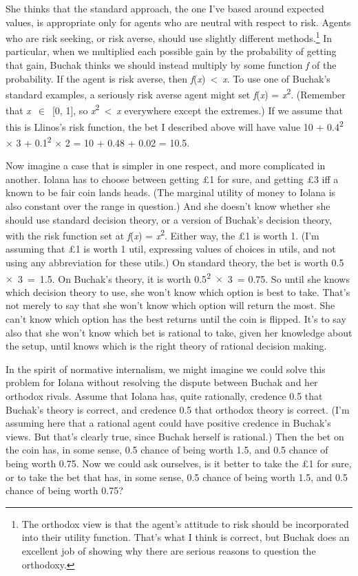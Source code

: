 \documentclass[
  10pt,
  letterpaper,
  twoside]{scrbook}
\begin{document}
She thinks that the standard approach, the one I've based around
expected values, is appropriate only for agents who are neutral with
respect to risk. Agents who are risk seeking, or risk averse, should use
slightly different methods.\footnote{The orthodox view is that the
  agent's attitude to risk should be incorporated into their utility
  function. That's what I think is correct, but Buchak does an excellent
  job of showing why there are serious reasons to question the
  orthodoxy.} In particular, when we multiplied each possible gain by
the probability of getting that gain, Buchak thinks we should instead
multiply by some function \emph{f} of the probability. If the agent is
risk averse, then \emph{f}(\emph{x})~\textless~\emph{x}. To use one of
Buchak's standard examples, a seriously risk averse agent might set
\emph{f}(\emph{x}) = \emph{x}\textsuperscript{2}. (Remember that
\emph{x}~\(\in\)~{[}0, 1{]}, so
\emph{x}\textsuperscript{2}~\textless~\emph{x} everywhere except the
extremes.) If we assume that this is {Llinos}'s risk function, the bet I
described above will have value 10 + 0.4\textsuperscript{2} \(\times\) 3
+ 0.1\textsuperscript{2} \(\times\) 2 = 10 + 0.48 + 0.02 = 10.5.

Now imagine a case that is simpler in one respect, and more complicated
in another. {Iolana} has to choose between getting £1 for sure, and
getting £3 iff a known to be fair coin lands heads. (The marginal
utility of money to Iolana is also constant over the range in question.)
And she doesn't know whether she should use standard decision theory, or
a version of Buchak's decision theory, with the risk function set at
\emph{f}(\emph{x}) = \emph{x}\textsuperscript{2}. Either way, the £1 is
worth 1. (I'm assuming that £1 is worth 1 util, expressing values of
choices in utils, and not using any abbreviation for these utils.) On
standard theory, the bet is worth 0.5~\(\times\)~3~=~1.5. On Buchak's
theory, it is worth 0.5\textsuperscript{2}~\(\times\)~3~= 0.75. So until
she knows which decision theory to use, she won't know which option is
best to take. That's not merely to say that she won't know which option
will return the most. She can't know which option has the best returns
until the coin is flipped. It's to say also that she won't know which
bet is rational to take, given her knowledge about the setup, until
knows which is the right theory of rational decision making.

In the spirit of normative internalism, we might imagine we could solve
this problem for {Iolana} without resolving the dispute between Buchak
and her orthodox rivals. Assume that {Iolana} has, quite rationally,
credence 0.5 that Buchak's theory is correct, and credence 0.5 that
orthodox theory is correct. (I'm assuming here that a rational agent
could have positive credence in Buchak's views. But that's clearly true,
since Buchak herself is rational.) Then the bet on the coin has, in some
sense, 0.5 chance of being worth 1.5, and 0.5 chance of being worth
0.75. Now we could ask ourselves, is it better to take the £1 for sure,
or to take the bet that has, in some sense, 0.5 chance of being worth
1.5, and 0.5 chance of being worth 0.75?
\end{document}
